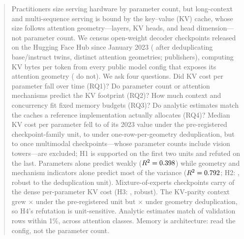 \begin{abstract}
Practitioners size serving hardware by parameter count, but long-context and
multi-sequence serving is bound by the key--value (KV) cache, whose size follows
attention geometry---layers, KV heads, and head dimension---not parameter count.
We census \kvcCensusRows{} open-weight decoder checkpoints released on the
Hugging Face Hub since January 2023 (\kvcDedupRows{} after deduplicating
base/instruct twins, \kvcGeoRows{} distinct attention geometries; \kvcOrgCount{}
publishers), computing KV bytes per token from every public model config that
exposes its attention geometry (\kvcKvErrRows{} do not). We ask four questions. Did KV cost per parameter
fall over time (RQ1)? Do parameter count or attention mechanisms predict the KV
footprint (RQ2)? How much context and concurrency fit fixed memory budgets
(RQ3)? Do analytic estimates match the caches a reference implementation
actually allocates (RQ4)? Median KV cost per parameter fell to \kvcHOneRatio{} of
its 2023 value under the pre-registered checkpoint-family unit, to
\kvcHOneRatioGeo{} under one-row-per-geometry deduplication, but to
\kvcHOneRatioNoMM{} once multimodal checkpoints---whose parameter counts include
vision towers---are excluded; H1 is supported on the first two units and refuted
on the last. Parameters alone predict weakly ($R^2=\kvcParamsRsq$) while geometry
and mechanism indicators alone predict most of the variance
($R^2=\kvcGeomRsq$; H2: \kvcHTwoVerdict, robust to the deduplication unit).
Mixture-of-experts checkpoints carry \kvcHThreeRatio{} of the dense per-parameter
KV cost (H3: \kvcHThreeVerdict, robust). The KV-parity context grew
\kvcHFourRatio$\times$ under the pre-registered unit but
\kvcHFourRatioGeo$\times$ under geometry deduplication, so H4's refutation is
unit-sensitive. Analytic estimates match \kvcValWithin{} of \kvcValRows{}
validation rows within 1\%, across \kvcValClasses{} attention classes. Memory is
architecture: read the config, not the parameter count.
\end{abstract}
